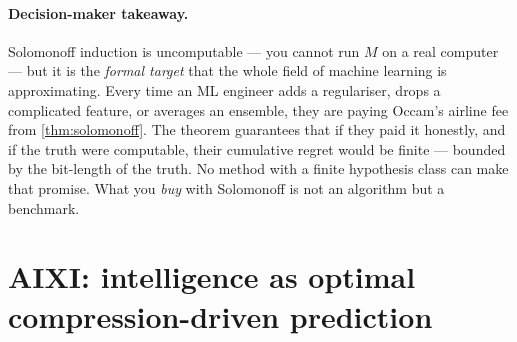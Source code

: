 \documentclass[12pt,a4paper]{article}
\theoremstyle{plain}
\theoremstyle{definition}
\begin{document}
\paragraph{Decision-maker takeaway.}  Solomonoff induction is
uncomputable --- you cannot run $M$ on a real computer --- but it is
the \emph{formal target} that the whole field of machine learning is
approximating.  Every time an ML engineer adds a regulariser, drops
a complicated feature, or averages an ensemble, they are paying
Occam's airline fee from \cref{thm:solomonoff}.  The theorem
guarantees that if they paid it honestly, and if the truth were
computable, their cumulative regret would be finite --- bounded by
the bit-length of the truth.  No method with a finite hypothesis
class can make that promise.  What you \emph{buy} with Solomonoff is
not an algorithm but a benchmark.



\section{AIXI: intelligence as optimal compression-driven prediction}
\label{sec:aixi}
\end{document}
